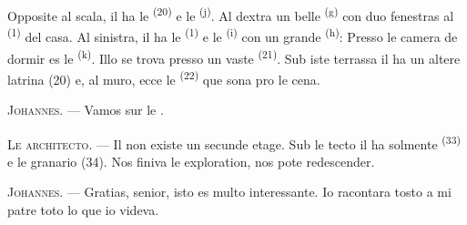 \VUsaut{3.0mm}
\VUsaut{3.0mm}

Opposite al scala, il ha le  \textsuperscript{(20)} e le
 \textsuperscript{(j)}. Al dextra un belle
 \textsuperscript{(g)} con duo fenestras al
 \textsuperscript{(1)} del casa. Al sinistra, il ha le  \textsuperscript{(1)} e le 
\textsuperscript{(i)} con un grande  \textsuperscript{(h)}:
Presso le camera de dormir es le 
\textsuperscript{(k)}. Illo se trova presso un vaste 
\textsuperscript{(21)}. Sub iste terrassa il ha un altere latrina (20) e, al
muro, ecce le  \textsuperscript{(22)} que sona pro le cena.

\textsc{Johannes}. --- Vamos sur le .

\textsc{Le architecto}. --- Il non existe un secunde etage. Sub le tecto il ha
solmente  \textsuperscript{(33)} e le granario (34). Nos
finiva le exploration, nos pote redescender.

\textsc{Johannes}. --- Gratias, senior, isto es multo interessante. Io
racontara tosto a mi patre toto lo que io videva.
\VUsaut{4.0mm}
\VUfilet{22mm}
